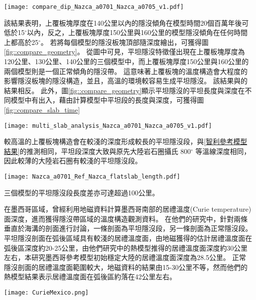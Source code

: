 \begin{figure*}[h]
    \centering
    \texttt{[image: compare\_dip\_Nazca\_a0701\_Nazca\_a0705\_v1.pdf]}
    \caption[不同上覆板塊厚度模型之隱沒傾角隨時間變化]{不同上覆板塊厚度模型之隱沒傾角隨時間變化。}
    \label{fig::compare_dip_thermal}
\end{figure*}

該結果表明，上覆板塊厚度在140公里以內的隱沒傾角在模型時間20個百萬年後可低於15$^\circ$以內，反之，上覆板塊厚度150公里與160公里的模型隱沒傾角在任何時間上都高於25$^\circ$。
若將每個模型的隱沒板塊頂部隨深度繪出，可獲得圖\ref{fig::compare_geometry}。
從圖中可見，平坦隱沒特徵僅出現在上覆板塊厚度為120公里、130公里、140公里的三個模型中，而上覆板塊厚度150公里與160公里的兩個模型則是一個正常傾角的隱沒帶。
這意味著上覆板塊的溫度構造會大程度的影響隱沒板塊的隱沒構造，並且，高溫的環境較容易生成平坦隱沒。
該結果與\citealp{Thermal2012}的結果相反。
此外，圖\ref{fig::compare_geometry}顯示平坦隱沒的平坦長度與深度在不同模型中有出入，藉由計算模型中平坦段的長度與深度，可獲得圖\ref{fig::compare_slab_time}
\begin{figure*}[h]
    \centering
    \texttt{[image: multi\_slab\_analysis\_Nazca\_a0701\_Nazca\_a0705\_v1.pdf]}
    \caption[不同上覆板塊厚度模型在50個百萬年的隱沒板塊構造]{不同上覆板塊厚度模型在50個百萬年時隱沒板塊於150公里以上之構造，幾何形狀取自隱沒板塊頂部，使用5公里移動平均平滑離散化的網格。}
    \label{fig::compare_geometry}
\end{figure*}

較高溫的上覆板塊構造會在較淺的深度形成較長的平坦隱沒段，與\ref{智利參考模型結果}的推測相同，平坦段深度大致與原先大陸岩石圈攝氏 800$^\circ$ 等溫線深度相同，因此較薄的大陸岩石圈有較淺的平坦隱沒段。
\begin{figure*}[h]
    \centering
    \texttt{[image: Nazca\_a0701\_Ref\_Nazca\_flatslab\_length.pdf]}
    \caption[不同上覆板塊厚度模型的平坦段長度與深度]{不同上覆板塊厚度模型的平坦段(a)長度與(b)深度。}
    \label{fig::compare_slab_time}
\end{figure*}

三個模型的平坦隱沒段長度差亦可達超過100公里。

在墨西哥區域，\citealp{Manea2011Curie}曾經利用地磁資料計算墨西哥南部的居禮溫度(Curie temperature)面深度，進而獲得隱沒帶區域的溫度構造觀測資料。
在他們的研究中，針對兩條垂直於海溝的剖面進行討論，一條剖面為平坦隱沒段，另一條剖面為正常隱沒段。
平坦隱沒剖面在弧後區域具有較淺的居禮溫度面，由地磁獲得的估計居禮溫度面在弧後區深度約20-25公里，由他們研究中的熱模型推得的居禮溫度面深度約30公里左右，本研究墨西哥參考模型初始穩定大陸的居禮溫度面深度為28.5公里。
正常隱沒剖面的居禮溫度面範圍較大，地磁資料的結果由15-30公里不等，然而他們的熱模型結果表示居禮溫度面在弧後區約落在42公里左右。
\begin{figure*}[h]
    \centering
    \texttt{[image: CurieMexico.png]}
    \caption[墨西哥兩條剖面的居禮溫度面與熱構造模型]{墨西哥兩條剖面的居禮溫度面與熱構造模型，摘自\citealp{Manea2011Curie}}
    \label{fig::CurieMexico}
\end{figure*}

